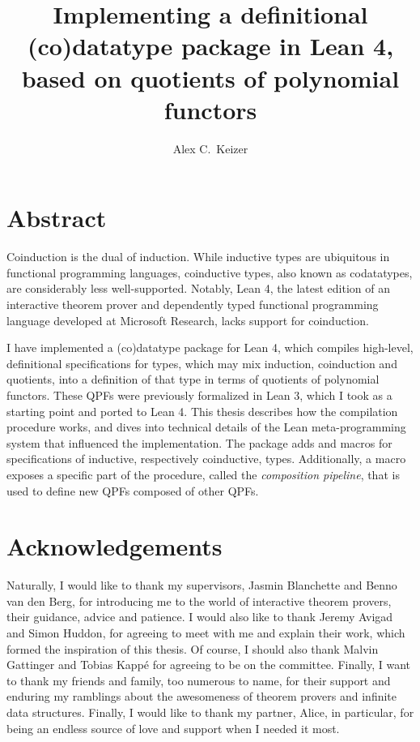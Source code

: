 
%
%
\title{Implementing a definitional (co)datatype package in Lean 4, based on quotients of polynomial functors}
\author{Alex C.\ Keizer}
\maketitle


\section*{Abstract}
Coinduction is the dual of induction. While inductive types are ubiquitous in functional programming
languages, coinductive types, also known as codatatypes, are considerably less well-supported.
Notably, Lean 4, the latest edition of an interactive theorem prover and dependently typed functional 
programming language developed at Microsoft Research, lacks support for coinduction.

I have implemented a (co)datatype package for Lean 4, which compiles high-level, definitional
specifications for types, which may mix induction, coinduction and quotients, into a definition
of that type in terms of quotients of polynomial functors.
These QPFs were previously formalized in Lean 3, which I took as a starting point and ported to Lean 4.
This thesis describes how the compilation procedure works, and dives into technical details of the Lean
meta-programming system that influenced the implementation.
The package adds \data{} and \codata{} macros for specifications of inductive, respectively coinductive, 
types. Additionally, a \qpf{} macro exposes a specific part of the procedure, called the \emph{composition pipeline},
that is used to define new QPFs composed of other QPFs.





\section*{Acknowledgements}
Naturally, I would like to thank my supervisors, Jasmin Blanchette and Benno van den Berg, for 
introducing me to the world of interactive theorem provers, their guidance, advice and patience.
I would also like to thank Jeremy Avigad and Simon Huddon, for agreeing to meet with me and explain their work, which formed the inspiration of this thesis. Of course, I should also thank Malvin Gattinger and
Tobias Kappé for agreeing to be on the committee. Finally, I want to thank my friends and family, too
numerous to name, for their support and enduring my ramblings about the awesomeness of theorem provers and infinite data structures. Finally, I would like to thank my partner, Alice, in particular, for
being an endless source of love and support when I needed it most.


\tableofcontents


\newpage
{}